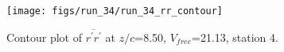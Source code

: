 \begin{figure}[H]
\centering
\texttt{[image: figs/run\_34/run\_34\_rr\_contour]}
\caption{Contour plot of $\overline{r^\prime r^\prime}$ at $z/c$=8.50, $V_{free}$=21.13, station 4.}
\label{fig:run_34_rr_contour}
\end{figure}


